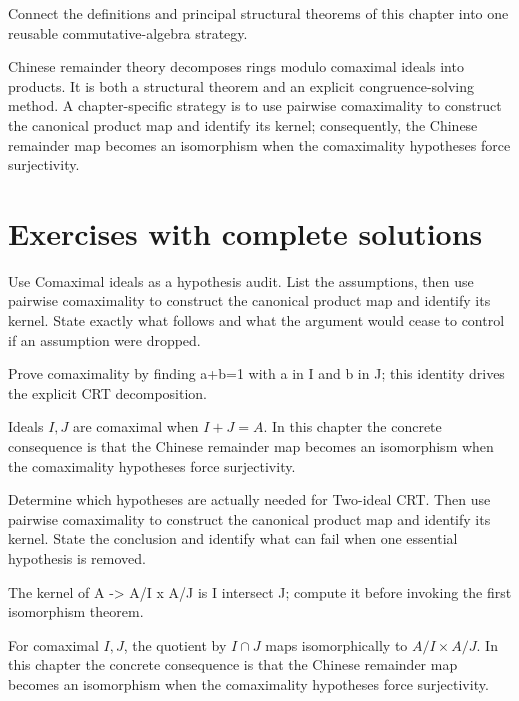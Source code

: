 \begin{problem}\label{prob:v04-problem-12}
Connect the definitions and principal structural theorems of this chapter into one reusable commutative-algebra strategy.
\end{problem}
\begin{solution}
Chinese remainder theory decomposes rings modulo comaximal ideals into products. It is both a structural theorem and an explicit congruence-solving method. A chapter-specific strategy is to use pairwise comaximality to construct the canonical product map and identify its kernel; consequently, the Chinese remainder map becomes an isomorphism when the comaximality hypotheses force surjectivity.
\end{solution}

\section{Exercises with complete solutions}

\begin{exercise}\label{exr:v04-01}
Use Comaximal ideals as a hypothesis audit. List the assumptions, then use pairwise comaximality to construct the canonical product map and identify its kernel. State exactly what follows and what the argument would cease to control if an assumption were dropped.
\end{exercise}
\begin{hint}
Prove comaximality by finding a+b=1 with a in I and b in J; this identity drives the explicit CRT decomposition.
\end{hint}
\begin{solution}
Ideals $I,J$ are comaximal when $I+J=A$. In this chapter the concrete consequence is that the Chinese remainder map becomes an isomorphism when the comaximality hypotheses force surjectivity.
\end{solution}

\begin{exercise}\label{exr:v04-02}
Determine which hypotheses are actually needed for Two-ideal CRT. Then use pairwise comaximality to construct the canonical product map and identify its kernel. State the conclusion and identify what can fail when one essential hypothesis is removed.
\end{exercise}
\begin{hint}
The kernel of A -> A/I x A/J is I intersect J; compute it before invoking the first isomorphism theorem.
\end{hint}
\begin{solution}
For comaximal $I,J$, the quotient by $I\cap J$ maps isomorphically to $A/I\times A/J$. In this chapter the concrete consequence is that the Chinese remainder map becomes an isomorphism when the comaximality hypotheses force surjectivity.
\end{solution}


